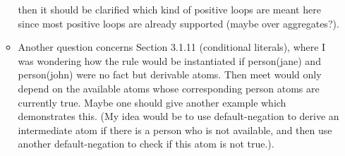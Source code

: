 \begin{itemize}
\begin{itemize}
    then it should be clarified which kind of positive loops are meant here
    since most positive loops are already supported (maybe over aggregates?).
  \item 
    Another question concerns Section 3.1.11 (conditional literals), where I
    was wondering how the rule would be instantiated if person(jane) and
    person(john) were no fact but derivable atoms. Then meet would only depend
    on the available atoms whose corresponding person atoms are currently true.
    Maybe one should give another example which demonstrates this. (My idea
    would be to use default-negation to derive an intermediate atom if there is
    a person who is not available, and then use another default-negation to
    check if this atom is not true.).
\end{itemize}
\end{itemize}

